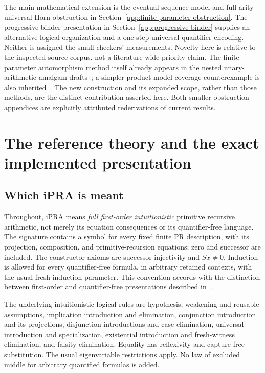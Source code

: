 The main mathematical extension is the eventual-sequence model
and full-arity universal-Horn obstruction in
Section~\ref{app:finite-parameter-obstruction}. The progressive-binder
presentation in Section~\ref{app:progressive-binder} supplies an alternative
logical organization and a one-step universal-quantifier encoding.
Neither is assigned the small checkers' measurements. Novelty here is
relative to the inspected source corpus, not a literature-wide priority claim.
The finite-parameter automorphism method itself already appears in the
nested unary-arithmetic amalgam drafts~\cite{prioramalgam}; a simpler
product-model coverage counterexample is also inherited~\cite{priorproduct}.
The new construction and its expanded scope, rather than those methods,
are the distinct contribution asserted here. Both smaller obstruction
appendices are explicitly attributed rederivations of current results.

\section{The reference theory and the exact implemented presentation}
\label{sec:implemented-theory}

\subsection{Which iPRA is meant}

Throughout, iPRA means \emph{full first-order intuitionistic} primitive
recursive arithmetic, not merely its equation consequences or its
quantifier-free language. The signature contains a symbol for every
fixed finite PR description, with its projection, composition, and
primitive-recursion equations; zero and successor are included. The
constructor axioms are successor injectivity and $Sx\ne0$. Induction
is allowed for every quantifier-free formula, in arbitrary retained
contexts, with the usual fresh induction parameter.
This convention accords with the distinction between first-order and
quantifier-free presentations described in~\cite{avigad}.

The underlying intuitionistic logical rules are hypothesis, weakening
and reusable assumptions, implication introduction and elimination,
conjunction introduction and its projections, disjunction introductions
and case elimination, universal introduction and specialization,
existential introduction and fresh-witness elimination, and falsity
elimination. Equality has reflexivity and capture-free substitution.
The usual eigenvariable restrictions apply. No law of excluded middle
for arbitrary quantified formulas is added.

